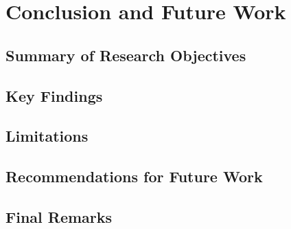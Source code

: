 \chapter{Conclusion and Future Work}
\label{chapter:conclusion}


\section{Summary of Research Objectives}
\label{section:summary_objectives}

\section{Key Findings}
\label{section:key_findings}

\section{Limitations}
\label{section:limitations}

\section{Recommendations for Future Work}
\label{section:future_work}

\section{Final Remarks}
\label{section:final_remarks}
